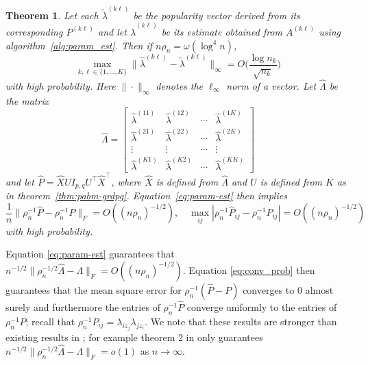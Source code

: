 \documentclass[
  11pt,
]{article}
\newtheorem{theorem}{Theorem}[section]
\theoremstyle{definition}
\theoremstyle{definition}
\theoremstyle{definition}
\theoremstyle{definition}
\theoremstyle{remark}
\begin{document}
\begin{theorem}
\label{thm:param-est}
Let each $\tilde{\lambda}^{(k \ell)}$ be the popularity vector derived from its corresponding $P^{(k \ell)}$ and let $\hat{\lambda}^{(k \ell)}$ be its estimate obtained from $A^{(k \ell)}$ using algorithm~\ref{alg:param_est}.
Then if $n \rho_n = \omega( \log^{4}{n})$,
\begin{equation} 
\label{eq:param-est}
\max_{k, \ell \in \{1, ..., K\}} 
\|\hat{\lambda}^{(k \ell)} - \tilde{\lambda}^{(k \ell)}\|_{\infty} = 
O\bigg(\frac{\log n_k}{\sqrt{n_k}} \bigg)
\end{equation}
with high probability. 
Here $\|\cdot\|_{\infty}$ denotes the $\ell_\infty$ norm of a vector. Let $\hat{\Lambda}$ be the matrix
$$\hat{\Lambda} = \begin{bmatrix} \hat{\lambda}^{(11)} &
  \hat{\lambda}^{(12)} & \cdots & \hat{\lambda}^{(1 K)} \\
  \hat{\lambda}^{(21)} &
  \hat{\lambda}^{(22)} & \cdots & \hat{\lambda}^{(2 K)} \\
  \vdots & \vdots & \cdots & \vdots \\
   \hat{\lambda}^{(K1)} &
  \hat{\lambda}^{(K2)} & \cdots & \hat{\lambda}^{(K K)} 
\end{bmatrix}$$
and let $\hat{P} = \hat{X} U I_{p,q} U^\top \hat{X}^{\top}$, where $\hat{X}$ is defined from $\hat{\Lambda}$ and $U$ is defined from $K$ as in theorem~\ref{thm:pabm-grdpg}. 
Equation~\eqref{eq:param-est} then implies
\begin{equation}
\label{eq:conv_prob}
\frac{1}{n} \|\rho_n^{-1} \hat{P} - \rho_n^{-1} P\|_{F} = O((n
\rho_n)^{-1/2}), \quad \max_{ij} |\rho_n^{-1} \hat{P}_{ij} -
\rho_n^{-1} P_{ij}| = O((n \rho_n)^{-1/2})
\end{equation}
with high probability. 
\end{theorem}

Equation \eqref{eq:param-est} guarantees that \(n^{-1/2} \|\rho_n^{-1/2} \hat{\Lambda} - \Lambda\|_{F} = O((n \rho_n)^{-1/2})\).
Equation \eqref{eq:conv_prob} then guarantees that the mean square error for \(\rho_n^{-1} (\hat{P} - P)\) converges to \(0\) almost surely and furthermore the entries of \(\rho_n^{-1} \hat{P}\) converge uniformly to the entries of \(\rho_n^{-1} P\);
recall that \(\rho_n^{-1} P_{ij} = \lambda_{iz_j} \lambda_{j z_i}\).
We note that these results are stronger than existing results in \citet{307cbeb9b1be48299388437423d94bf1};
for example theorem 2 in \citet{307cbeb9b1be48299388437423d94bf1} only guarantees
\(n^{-1/2} \|\rho_n^{-1/2} \hat{\Lambda} - \Lambda\|_{F} = o(1)\) as \(n \rightarrow \infty\).
\end{document}
